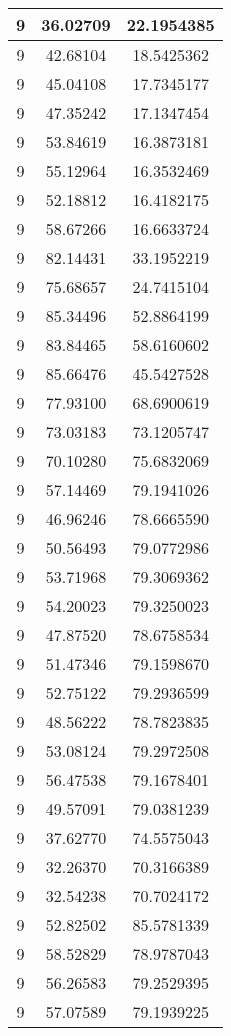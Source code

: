 \documentclass[
]{book}
\begin{document}
\begin{tabular}{c|c|c}
\hline
9 & 36.02709 & 22.1954385\\
\hline
9 & 42.68104 & 18.5425362\\
\hline
9 & 45.04108 & 17.7345177\\
\hline
9 & 47.35242 & 17.1347454\\
\hline
9 & 53.84619 & 16.3873181\\
\hline
9 & 55.12964 & 16.3532469\\
\hline
9 & 52.18812 & 16.4182175\\
\hline
9 & 58.67266 & 16.6633724\\
\hline
9 & 82.14431 & 33.1952219\\
\hline
9 & 75.68657 & 24.7415104\\
\hline
9 & 85.34496 & 52.8864199\\
\hline
9 & 83.84465 & 58.6160602\\
\hline
9 & 85.66476 & 45.5427528\\
\hline
9 & 77.93100 & 68.6900619\\
\hline
9 & 73.03183 & 73.1205747\\
\hline
9 & 70.10280 & 75.6832069\\
\hline
9 & 57.14469 & 79.1941026\\
\hline
9 & 46.96246 & 78.6665590\\
\hline
9 & 50.56493 & 79.0772986\\
\hline
9 & 53.71968 & 79.3069362\\
\hline
9 & 54.20023 & 79.3250023\\
\hline
9 & 47.87520 & 78.6758534\\
\hline
9 & 51.47346 & 79.1598670\\
\hline
9 & 52.75122 & 79.2936599\\
\hline
9 & 48.56222 & 78.7823835\\
\hline
9 & 53.08124 & 79.2972508\\
\hline
9 & 56.47538 & 79.1678401\\
\hline
9 & 49.57091 & 79.0381239\\
\hline
9 & 37.62770 & 74.5575043\\
\hline
9 & 32.26370 & 70.3166389\\
\hline
9 & 32.54238 & 70.7024172\\
\hline
9 & 52.82502 & 85.5781339\\
\hline
9 & 58.52829 & 78.9787043\\
\hline
9 & 56.26583 & 79.2529395\\
\hline
9 & 57.07589 & 79.1939225\\

\end{tabular}
\end{document}
